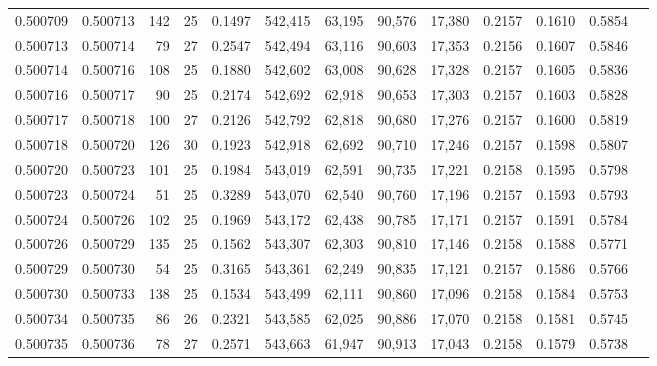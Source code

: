 \begin{tabular}{rrrrrrrrrrrrr}
0.500709 & 0.500713 & 142 &  25 &                                     0.1497 & 542,415 &  63,195 &  90,576 &  17,380 & 0.2157 & 0.1610 & 0.5854 \\
0.500713 & 0.500714 &  79 &  27 &                                     0.2547 & 542,494 &  63,116 &  90,603 &  17,353 & 0.2156 & 0.1607 & 0.5846 \\
0.500714 & 0.500716 & 108 &  25 &                                     0.1880 & 542,602 &  63,008 &  90,628 &  17,328 & 0.2157 & 0.1605 & 0.5836 \\
0.500716 & 0.500717 &  90 &  25 &                                     0.2174 & 542,692 &  62,918 &  90,653 &  17,303 & 0.2157 & 0.1603 & 0.5828 \\
0.500717 & 0.500718 & 100 &  27 &                                     0.2126 & 542,792 &  62,818 &  90,680 &  17,276 & 0.2157 & 0.1600 & 0.5819 \\
0.500718 & 0.500720 & 126 &  30 &                                     0.1923 & 542,918 &  62,692 &  90,710 &  17,246 & 0.2157 & 0.1598 & 0.5807 \\
0.500720 & 0.500723 & 101 &  25 &                                     0.1984 & 543,019 &  62,591 &  90,735 &  17,221 & 0.2158 & 0.1595 & 0.5798 \\
0.500723 & 0.500724 &  51 &  25 &                                     0.3289 & 543,070 &  62,540 &  90,760 &  17,196 & 0.2157 & 0.1593 & 0.5793 \\
0.500724 & 0.500726 & 102 &  25 &                                     0.1969 & 543,172 &  62,438 &  90,785 &  17,171 & 0.2157 & 0.1591 & 0.5784 \\
0.500726 & 0.500729 & 135 &  25 &                                     0.1562 & 543,307 &  62,303 &  90,810 &  17,146 & 0.2158 & 0.1588 & 0.5771 \\
0.500729 & 0.500730 &  54 &  25 &                                     0.3165 & 543,361 &  62,249 &  90,835 &  17,121 & 0.2157 & 0.1586 & 0.5766 \\
0.500730 & 0.500733 & 138 &  25 &                                     0.1534 & 543,499 &  62,111 &  90,860 &  17,096 & 0.2158 & 0.1584 & 0.5753 \\
0.500734 & 0.500735 &  86 &  26 &                                     0.2321 & 543,585 &  62,025 &  90,886 &  17,070 & 0.2158 & 0.1581 & 0.5745 \\
0.500735 & 0.500736 &  78 &  27 &                                     0.2571 & 543,663 &  61,947 &  90,913 &  17,043 & 0.2158 & 0.1579 & 0.5738 \\

\end{tabular}
